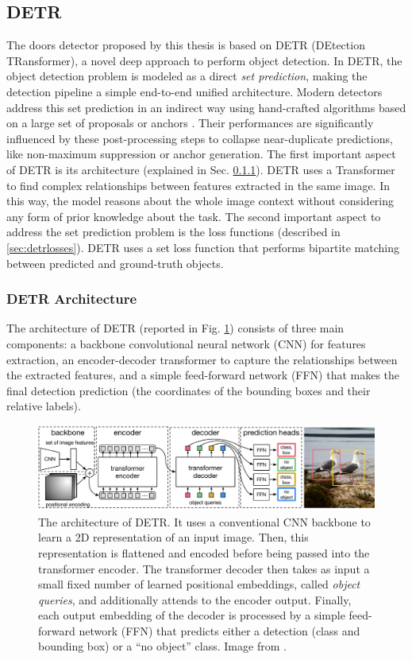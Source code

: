 \subsection{DETR}
\label{sec:detr}
The doors detector proposed by this thesis is based on DETR \cite{detr} (DEtection TRansformer), a novel deep approach to perform object detection.  In DETR, the object detection problem is modeled as a direct \textit{set prediction}, making the detection pipeline a simple end-to-end unified architecture. Modern detectors address this set prediction in an indirect way using hand-crafted algorithms based on a large set of proposals \cite{yolo} or anchors \cite{focalloss}. Their performances are significantly influenced by these post-processing steps to collapse near-duplicate predictions, like non-maximum suppression or anchor generation. The first important aspect of DETR  is its architecture (explained in Sec. \ref{sec:detrarchitecture}). DETR uses a Transformer to find complex relationships between features extracted in the same image. In this way, the model reasons about the whole image context without considering any form of prior knowledge about the task. The second important aspect to address the set prediction problem is the loss functions (described in \ref{sec:detrlosses}). DETR uses a set loss function that performs bipartite matching between predicted and ground-truth objects.

\subsubsection{DETR Architecture}
\label{sec:detrarchitecture}
The architecture of DETR (reported in Fig. \ref{fig:detrarchiecture}) consists of three main components: a backbone convolutional neural network (CNN) for features extraction, an encoder-decoder transformer to capture the relationships between the extracted features, and a simple feed-forward network (FFN) that makes the final detection prediction (the coordinates of the bounding boxes and their relative labels).

\begin{figure}[h!]
	\centering
	\includegraphics[width=\linewidth]{images/detrarchitecture.pdf}
	\caption{The architecture of DETR. It uses a conventional CNN backbone to learn a 2D representation of an input image. Then, this representation is flattened and encoded before being passed into the transformer encoder. The transformer decoder then takes as input a small fixed number of learned positional embeddings, called \textit{object queries}, and additionally attends to the encoder output. Finally, each output embedding of the decoder is processed by a  simple feed-forward network (FFN) that predicts either a detection (class and bounding box) or a ``no object'' class. Image from \cite{detr}.}
	\label{fig:detrarchiecture}
\end{figure}

